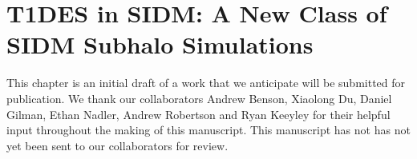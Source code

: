 \chapter{T1DES in SIDM: A New Class of SIDM Subhalo Simulations}\label{chap:tides}
This chapter is an initial draft of a work that we anticipate will be submitted for publication. We thank our collaborators Andrew Benson, Xiaolong Du, Daniel Gilman, Ethan Nadler, Andrew Robertson and Ryan Keeyley for their helpful input throughout the making of this manuscript. This manuscript has not has not yet been sent to our collaborators for review.
